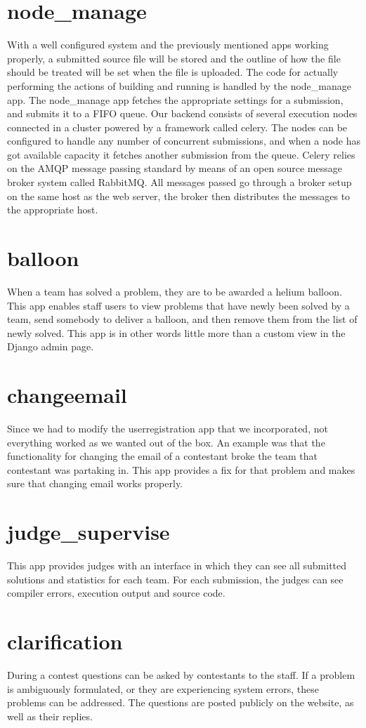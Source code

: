 \section{node\_manage}
With a well configured system and the previously mentioned apps working
properly, a submitted source file will be stored and the outline of how
the file should be treated will be set when the file is uploaded. The
code for actually performing the actions of building and running is
handled by the node\_manage app. The node\_manage app fetches the
appropriate settings for a submission, and submits it to a FIFO queue.
Our backend consists of several execution nodes connected in a cluster
powered by a framework called celery. The nodes can be configured to
handle any number of concurrent submissions, and when a node has got
available capacity it fetches another submission from the queue. Celery
relies on the AMQP message passing standard by means of an open source
message broker system called RabbitMQ. All messages passed go through a
broker setup on the same host as the web server, the broker then
distributes the messages to the appropriate host. 

\section{balloon}
When a team has solved a problem, they are to be awarded a helium
balloon. This app enables staff users to view problems that have newly
been solved by a team, send somebody to deliver a balloon, and then
remove them from the list of newly solved. This app is in other words
little more than a custom view in the Django admin page.

\section{changeemail}
Since we had to modify the userregistration app that we incorporated,
not everything worked as we wanted out of the box. An example was that
the functionality for changing the email of a contestant broke the team
that contestant was partaking in. This app provides a fix for that
problem and makes sure that changing email works properly.

\section{judge\_supervise}
This app provides judges with an interface in which they can see all
submitted solutions and statistics for each team. For each submission,
the judges can see compiler errors, execution output and source code. 

\section{clarification}
During a contest questions can be asked by contestants to the staff. If
a problem is ambiguously formulated, or they are experiencing system
errors, these problems can be addressed. The questions are posted
publicly on the website, as well as their replies. \ 

